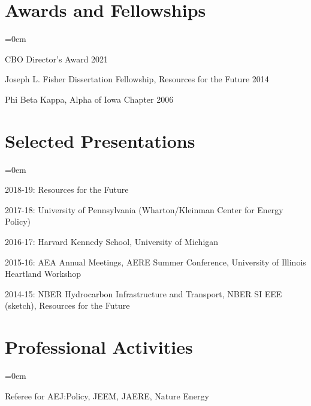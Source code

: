 \documentclass[letterpaper]{article}
\renewenvironment{itemize}{
  \vspace{-0.5em}
  \begin{list}{}{
	\itemsep=0em
    \setlength{\leftmargin}{1.5em}
  }
}{
  \end{list}
}
\begin{document}
\section*{Awards and Fellowships}
\begin{itemize}
\item CBO Director's Award \hfill 2021
\item Joseph L. Fisher Dissertation Fellowship, Resources for the Future	\hfill 2014
\item Phi Beta Kappa, Alpha of Iowa Chapter	\hfill 2006
\end{itemize}

\section*{Selected Presentations}
\begin{itemize}
	\item 2018-19: Resources for the Future
	\item 2017-18: University of Pennsylvania (Wharton/Kleinman Center for Energy Policy)
	\item 2016-17: Harvard Kennedy School, University of Michigan
	\item 2015-16: AEA Annual Meetings, AERE Summer Conference, University of Illinois Heartland Workshop
	\item 2014-15: NBER Hydrocarbon Infrastructure and Transport, NBER SI EEE (sketch), Resources for the Future
\end{itemize}

\section*{Professional Activities}
\begin{itemize}
\item Referee for AEJ:Policy, JEEM, JAERE, Nature Energy
\end{itemize}
\end{document}
